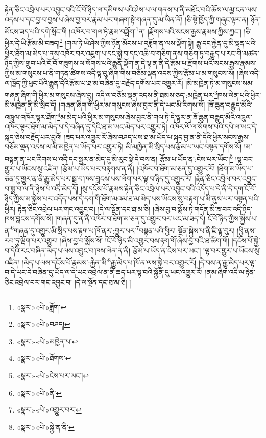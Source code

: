 རྟེན་ཅིང་འབྲེལ་པར་འབྱུང་བའི་ངོ་བོ་ཉིད་ལ་དམིགས་པའི་ཤེས་པ་ལ་གནས་པ་ནི་མཐོང་བའི་ཆོས་ལ་མྱ་ངན་ལས་འདས་པ་དང་བྱ་བ་བྱས་པ་ཞེས་བྱ་བར་རྣམ་པར་གཞག་སྟེ་གཞན་དུ་མ་ཡིན་ནོ། །ཅི་སྟེ་ཁྱོད་ཀྱི་གཞུང་ལྟར་ན། ཉོན་མོངས་ཟད་པའི་དགེ་སློང་གི །འཁོར་བ་གལ་ཏེ་རྣམ་བཟློག་\footnote{«སྣར་»«པེ་»ཟློག་}ན། །རྫོགས་པའི་སངས་རྒྱས་རྣམས་ཀྱིས་ཀྱང་། །ཅི་ཕྱིར་དེ་ཡི་རྩོམ་མི་བཟད།\footnote{«སྣར་»«པེ་»བཤད།} །གལ་ཏེ་ཡེ་ཤེས་ཀྱིས་ཉོན་མོངས་པ་བཟློག་ན་ལས་ལྡོག་སྟེ། རྒྱུ་དང་རྐྱེན་དུ་མི་ལྡན་པའི་ཕྱིར་ཐོག་མ་མེད་པ་ནས་འཁོར་བར་འཇུག་པ་དང་སྐྱེ་བ་དང་འཆི་བ་གཅིག་ནས་གཅིག་ཏུ་བརྒྱུད་པ་རང་གི་མཚན་ཉིད་ཀྱིས་གྲུབ་པའི་ངོ་བོ་གཟུགས་ལ་སོགས་པའི་རྒྱུན་ལྡོག་ན་དེ་ལྟ་ན་ནི་དེ་རྩོམ་པ་རྫོགས་པའི་སངས་རྒྱས་རྣམས་ཀྱིས་མ་གསུངས་པ་ནི་གཏན་ཚིགས་འདི་ལྟ་བུ་ཞིག་གིས་བཅོམ་ལྡན་འདས་ཀྱིས་རྩོམ་པ་མ་གསུངས་སོ། །ཞེས་འདི་ལ་ཁྱོད་ཀྱི་ཕུང་པོའི་རྒྱུན་དེའི་རྩོམ་པ་ཐ་མ་བཞིན་དུ་བརྗོད་དགོས་པར་འགྱུར་རོ། །མི་མཁྱེན་ཏེ་མ་གསུངས་སམ་གཞན་ཞིག་གི་ཕྱིར་མ་གསུངས་ཞེས་བྱ། འདི་ལ་བཅོམ་ལྡན་འདས་ནི་ཐམས་ཅད་:མཁྱེན་པར་\footnote{«སྣར་»«པེ་»མཁྱེན་པ་}ཁས་ལེན་པའི་ཕྱིར་མི་མཁྱེན་ནི་མི་སྲིད་དོ། །གཞན་ཞིག་གི་ཕྱིར་མ་གསུངས་ཞེས་བྱར་ནི་དེ་ཡང་མི་རིགས་སོ། །ཟོ་ཆུན་བརྒྱུད་མོའི་འཁྲུལ་འཁོར་ལྟར་ཐོག་\footnote{«སྣར་»«པེ་»ཐོགས་}མ་མེད་པའི་ཕྱིར་མ་གསུངས་ཞེས་བྱར་ནི་གལ་ཏེ་དེ་ལྟར་ན་ཟོ་ཆུན་བརྒྱུད་མོའི་འཁྲུལ་འཁོར་ལྟར་ཐོག་མ་མེད་པ་དེ་བཞིན་དུ་དེའི་ཐ་མ་ཡང་མེད་པར་འགྱུར་ཏེ། འཁོར་ལོ་ལ་སོགས་པའི་དཔེ་ལ་ཡང་དེ་སྐད་ཅེས་བརྗོད་པར་བྱའོ། །ཟད་པར་འགྱུར་རོ་ཞེས་བཤད་པས་ཐ་མ་ཡོད་པ་སྐད་བྱ་ན་ནི་དེའི་ཕྱིར་སངས་རྒྱས་བཅོམ་ལྡན་འདས་ལ་མི་མཁྱེན་པ་ཡོད་པར་འགྱུར་ཏེ། མི་མཁྱེན་མི་སྲིད་པས་རྩོམ་པ་ཡང་བསྟན་དགོས་སོ། །མ་བསྟན་ན་ཡང་རིགས་པ་འདི་དང་སྦྱར་ན་མེད་དུ་མི་རུང་སྟེ་དེ་བས་ན། རྩོམ་པ་ཡོད་ན་:ངེས་པར་ཡོང་།\footnote{«སྣར་»«པེ་»ངེས་པར་ཡང་།} །ལྟ་བར་གྱུར་པ་ཡོངས་སུ་འཛིན། །རྩོམ་པ་ཡོད་པར་བརྟགས་ན་ནི། །འཁོར་བ་ཐོག་མ་ཅན་དུ་འགྱུར་རོ། །ཐོག་མ་ཡོད་པ་ཅན་དུ་གྱུར་ན་ནི་རྒྱུ་མེད་པར་སྨྲ་བ་ཁས་བླངས་པས་ལོག་པར་ལྟ་བ་ཉིད་དུ་འགྱུར་རོ། །རྟེན་ཅིང་འབྲེལ་བར་འབྱུང་བ་སྨྲ་བ་ལ་ནི་ཉེས་པ་འདི་མེད་དོ། །སུ་དངོས་པོ་རྣམས་རྟེན་ཅིང་འབྲེལ་པར་འབྱུང་བའི་འདོད་པ་དེ་ནི་དེ་དག་ངོ་བོ་ཉིད་ཀྱིས་མ་སྐྱེས་པར་འདོད་པས་དེ་དག་གི་ཐོག་མའམ་ཐ་མ་མེད་པས་ཡོངས་སུ་བརྟག་པ་མི་ནུས་པར་བསྟན་པའི་ཕྱིར། རྟེན་ཅིང་འབྲེལ་པར་གང་འབྱུང་བ། །དེ་ལ་སྔོན་དང་ཐ་མ་ཅི། །ཞེས་བྱ་བ་སྨོས་ཏེ་གདོན་མི་ཟ་བར་འདི་ཉིད་ཁས་བླངས་དགོས་སོ། །གཞན་དུ་ན་ནི་འཁོར་བ་ཐོག་མ་ཅན་དུ་འགྱུར་བར་ཡང་མ་ཟད་དེ། ངོ་བོ་ཉིད་ཀྱིས་སྐྱེས་པ་ན་\footnote{«སྣར་»«པེ་»ནི་}གཞན་དུ་འགྱུར་མི་སྲིད་པས་རྟག་པ་ཁོ་ནར་:གྱུར་པར་\footnote{«སྣར་»«པེ་»འགྱུར་བར་}བསྟན་པའི་ཕྱིར། སྔོན་སྐྱེས་པ་ནི་ཇི་ལྟ་བུར། །ཕྱི་ནས་རབ་ཏུ་ལྡོག་པར་འགྱུར། །ཞེས་བྱ་བ་སྨོས་སོ། །ངོ་བོ་ཉིད་མི་འགྱུར་བས་རྟག་གོ་ཞེས་བྱ་བའི་ཐ་ཚིག་གོ། །དངོས་པོ་སྐྱེ་བ་དེའི་རང་བཞིན་མེད་པ་ལས་འབྱུང་བ་ཁས་ལེན་ན་ནི། རྩོམ་པ་ཡོད་ན་ངེས་པར་ཡང་། །ལྟ་བར་གྱུར་པ་ཡོངས་སུ་འཛིན། །མེད་པ་ལས་དངོས་པོ་རྣམས་:རྐྱེན་མི་\footnote{«སྣར་»«པེ་»སྐྱེ་ན་ནི་}རྒྱུ་མེད་པ་ཁོ་ན་ལས་སྐྱེ་བར་འགྱུར་རོ། །དེ་བས་ན་རྒྱུ་མེད་པར་ལྟ་བ་དེ་ཡང་དེ་བཞིན་དུ་ཡོད་ལ་དེ་ཡང་འབྲེལ་ན་ནི་ཆད་པར་ལྟ་བའི་སྐྱོན་དུ་ཡང་འགྱུར་རོ། །ནམ་ཞིག་འདི་ལ་རྟེན་ཅིང་འབྲེལ་བར་གང་འབྱུང་བ། །དེ་ལ་སྔོན་དང་ཐ་མ་ཅི། །
